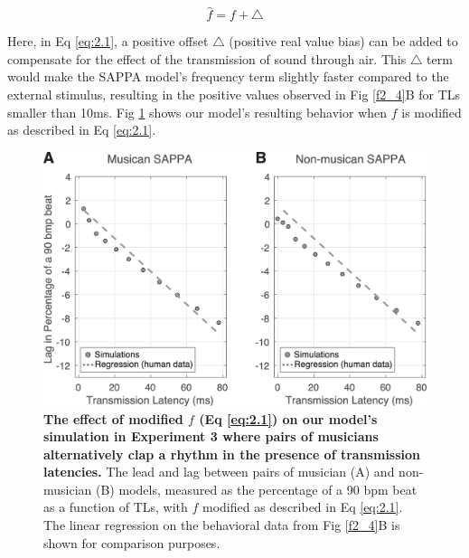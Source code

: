 \documentclass{report}
\begin{document}
\begin{equation}
\hat{f} = f + \triangle \label{eq:2.1}
\end{equation}

Here, in Eq \eqref{eq:2.1}, a positive offset $\triangle$ (positive real value bias) can be added to compensate for the effect of the transmission of sound through air. This $\triangle$ term would make the SAPPA model’s frequency term slightly faster compared to the external stimulus, resulting in the positive values observed in Fig \ref{f2_4}B for TLs smaller than 10ms. Fig \ref{f2_5} shows our model's resulting behavior when $f$ is modified as described in Eq \eqref{eq:2.1}.

\begin{figure}
    \centering
    \includegraphics[width=1.0\textwidth]{figures/fig2_5.png}
    \caption[The effect of modified $f$ (Eq \eqref{eq:2.1}) on our model's simulation in Experiment 3 where pairs of musicians alternatively clap a rhythm in the presence of transmission latencies]{\textbf{The effect of modified $f$ (Eq \eqref{eq:2.1}) on our model's simulation in Experiment 3 where pairs of musicians alternatively clap a rhythm in the presence of transmission latencies.} The lead and lag between pairs of musician (A) and non-musician (B) models, measured as the percentage of a 90 bpm beat as a function of TLs, with $f$ modified as described in Eq \eqref{eq:2.1}. The linear regression on the behavioral data from Fig \ref{f2_4}B is shown for comparison purposes.} 
    \label{f2_5}
\end{figure}
\end{document}

